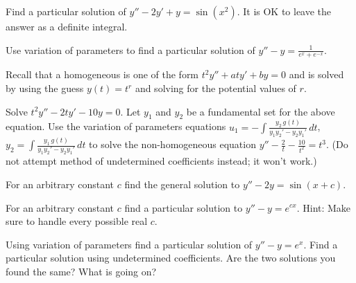 \documentclass{ximera}
\begin{document}
\begin{exercise}
    Find a particular solution of $y''-2y' +y = \sin (x^2)$.  It is OK to leave the answer as a definite integral.
\end{exercise}

\begin{exercise}
    Use variation of parameters to find a particular solution of $y''-y = \frac{1}{e^x+e^{-x}}$.
\end{exercise}

\begin{exercise}
    Recall that a homogeneous \emph{} is one of the form $t^2y'' + aty' + by = 0$ and is solved by using the guess $y(t) = t^r$ and solving for the potential values of $r$. 
    \begin{tasks}
        \task Solve $t^2y''-2ty'-10y=0$. %
        \task Let $y_1$ and $y_2$ be a fundamental set for the above equation. Use the variation of parameters equations $\displaystyle u_1=-\int \frac{y_2\, g(t)}{y_1y_2' - y_2y_1'}\,dt$, $\displaystyle y_2=\int \frac{y_1\, g(t)}{y_1y_2' - y_2y_1'}\,dt$ to solve the non-homogeneous equation $\displaystyle y''-\frac{2}{t} - \frac{10}{t^2}=t^3$. \hfill\break (Do not attempt method of undetermined coefficients instead; it won't work.)
    \end{tasks}
\end{exercise}

\begin{exercise}
    For an arbitrary constant $c$ find the general solution to $y''-2y=\sin(x+c)$.
\end{exercise}

\begin{exercise}
    For an arbitrary constant $c$ find a particular solution to $y''-y=e^{cx}$.  Hint: Make sure to handle every possible real $c$.
\end{exercise}

\begin{exercise} \label{exercise:diffvarparunder}
    \begin{tasks}
        \task Using variation of parameters find a particular solution of $y''-y = e^x$.
        \task Find a particular solution using undetermined coefficients.
        \task Are the two solutions you found the same? What is going on?
    \end{tasks}
\end{exercise}

\end{document}
